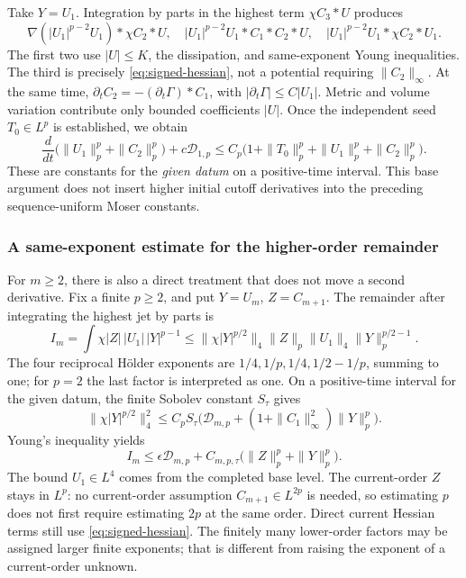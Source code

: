 \documentclass[a4paper,11pt]{article}
\numberwithin{equation}{section}
\theoremstyle{definition}
\begin{document}
Take $Y=U_1$. Integration by parts in the highest term $\chi C_3*U$ produces
\[
\nabla(|U_1|^{p-2}U_1)*\chi C_2*U,\quad
|U_1|^{p-2}U_1*C_1*C_2*U,\quad
|U_1|^{p-2}U_1*\chi C_2*U_1.
\]
The first two use $|U|\le K$, the dissipation, and same-exponent Young inequalities. The third is precisely
\eqref{eq:signed-hessian}, not a potential requiring $\|C_2\|_\infty$.
At the same time, $\partial_tC_2=-(\partial_t\Gamma)*C_1$, with
$|\partial_t\Gamma|\le C|U_1|$. Metric and volume variation contribute only bounded coefficients $|U|$.
Once the independent seed $T_0\in L^p$ is established, we obtain
\begin{equation}\label{eq:first-coupled-energy}
\frac d{dt}\bigl(\|U_1\|_p^p+\|C_2\|_p^p\bigr)
+c\mathcal D_{1,p}
\le C_p\bigl(1+\|T_0\|_p^p+\|U_1\|_p^p+\|C_2\|_p^p\bigr).
\end{equation}
These are constants for the \emph{given datum} on a positive-time interval. This base argument does not insert higher initial cutoff derivatives into the preceding sequence-uniform Moser constants.

\subsubsection{A same-exponent estimate for the higher-order remainder}\label{sec:jet-same-exponent}
For $m\ge2$, there is also a direct treatment that does not move a second derivative.
Fix a finite $p\ge2$, and put $Y=U_m$, $Z=C_{m+1}$.
The remainder after integrating the highest jet by parts is
\[
I_m=\int\chi|Z|\,|U_1|\,|Y|^{p-1}
\le\|\chi|Y|^{p/2}\|_4\|Z\|_p\|U_1\|_4
\|Y\|_p^{p/2-1}.
\]
The four reciprocal H\"older exponents are
$1/4,1/p,1/4,1/2-1/p$, summing to one; for $p=2$ the last factor is interpreted as one.
On a positive-time interval for the given datum, the finite Sobolev constant $S_\tau$ gives
\[
\|\chi|Y|^{p/2}\|_4^2
\le C_pS_\tau\bigl(\mathcal D_{m,p}+
(1+\|C_1\|_\infty^2)\|Y\|_p^p\bigr).
\]
Young's inequality yields
\begin{equation}\label{eq:same-exponent-residual}
I_m\le\epsilon\mathcal D_{m,p}
+C_{m,p,\tau}\bigl(\|Z\|_p^p+\|Y\|_p^p\bigr).
\end{equation}
The bound $U_1\in L^4$ comes from the completed base level.
The current-order $Z$ stays in $L^p$: no current-order assumption $C_{m+1}\in L^{2p}$ is needed,
so estimating $p$ does not first require estimating $2p$ at the same order. Direct current Hessian terms still use
\eqref{eq:signed-hessian}. The finitely many lower-order factors may be assigned larger finite exponents;
that is different from raising the exponent of a current-order unknown.
\end{document}
